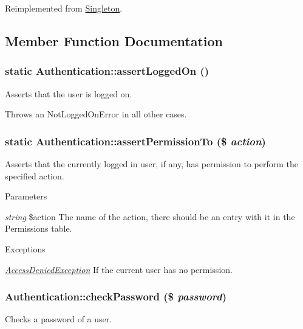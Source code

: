 Reimplemented from \hyperlink{classSingleton}{Singleton}.



\subsection{Member Function Documentation}
\hypertarget{classAuthentication_a6e29c7efa70a367135d3e7bf464fad52}{
\subsubsection[{assertLoggedOn}]{\setlength{\rightskip}{0pt plus 5cm}static Authentication::assertLoggedOn ()}}
\label{classAuthentication_a6e29c7efa70a367135d3e7bf464fad52}
Asserts that the user is logged on.

Throws an NotLoggedOnError in all other cases. \hypertarget{classAuthentication_a11dc5e2b83d14bcbcc35c7dd5584a1e5}{
\subsubsection[{assertPermissionTo}]{\setlength{\rightskip}{0pt plus 5cm}static Authentication::assertPermissionTo (\$ {\em action})}}
\label{classAuthentication_a11dc5e2b83d14bcbcc35c7dd5584a1e5}
Asserts that the currently logged in user, if any, has permission to perform the specified action.


\begin{DoxyParams}{Parameters}
\item[{\em string}]\$action The name of the action, there should be an entry with it in the Permissions table.\end{DoxyParams}

\begin{DoxyExceptions}{Exceptions}
\item[{\em \hyperlink{classAccessDeniedException}{AccessDeniedException}}]If the current user has no permission. \end{DoxyExceptions}
\hypertarget{classAuthentication_a317b36d37a99df0476dd0ec55f52bf9d}{
\subsubsection[{checkPassword}]{\setlength{\rightskip}{0pt plus 5cm}Authentication::checkPassword (\$ {\em password})}}
\label{classAuthentication_a317b36d37a99df0476dd0ec55f52bf9d}
Checks a password of a user.


